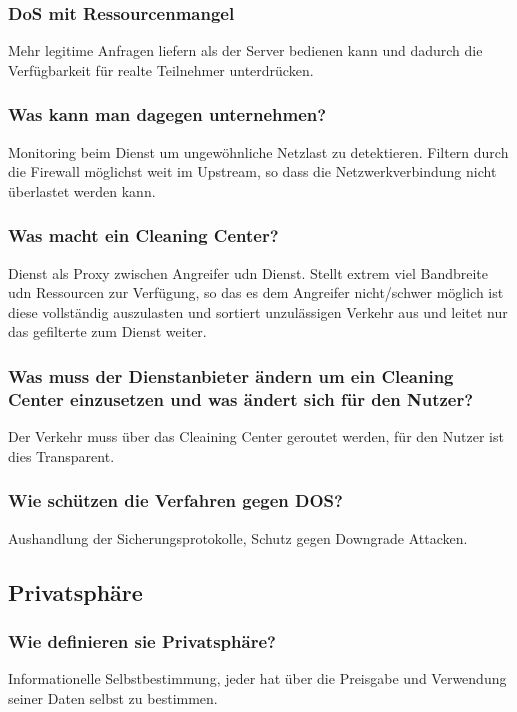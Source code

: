 	\subsubsection{DoS mit Ressourcenmangel}
	Mehr legitime Anfragen liefern als der Server bedienen kann und dadurch die Verfügbarkeit für realte Teilnehmer unterdrücken.
	
	\subsubsection{Was kann man dagegen unternehmen?}
	Monitoring beim Dienst um ungewöhnliche Netzlast zu detektieren. Filtern durch die Firewall möglichst weit im Upstream, so dass die Netzwerkverbindung nicht überlastet werden kann. 
	
	\subsubsection{Was macht ein Cleaning Center?}
	Dienst als Proxy zwischen Angreifer udn Dienst. Stellt extrem viel Bandbreite udn Ressourcen zur Verfügung, so das es dem Angreifer nicht/schwer möglich ist diese vollständig auszulasten und sortiert unzulässigen Verkehr aus und leitet nur das gefilterte zum Dienst weiter.
	
	\subsubsection{Was muss der Dienstanbieter ändern um ein Cleaning Center einzusetzen und was ändert sich für den Nutzer?}
	Der Verkehr muss über das Cleaining Center geroutet werden, für den Nutzer ist dies Transparent.
	
	\subsubsection{Wie schützen die Verfahren gegen DOS?}
	Aushandlung der Sicherungsprotokolle, Schutz gegen Downgrade Attacken.
	
	\subsection{Privatsphäre}
	\subsubsection{Wie definieren sie Privatsphäre?}
	Informationelle Selbstbestimmung, jeder hat über die Preisgabe und Verwendung seiner Daten selbst zu bestimmen.
	
